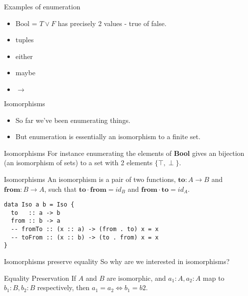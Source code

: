\documentclass[tikz]{beamer}
\theoremstyle{definition}
\begin{document}
\begin{frame}{Examples of enumeration}

    \begin{itemize}
    	\item Bool = $T \lor F$ has precisely 2 values - true of false.
	\item tuples
	\item either
	\item maybe
	\item $\to$
    \end{itemize}

\end{frame}{}

\begin{frame}{Isomorphisms}
	\begin{itemize}
	\item So far we've been enumerating things.
	\item But enumeration is essentially an isomorphism to a finite set.
	\end{itemize}
\end{frame}

\begin{frame}{Isomorphisms}
	For instance enumerating the elements of \textbf{Bool} gives an bijection (an isomorphism of sets) to a set with 2 elements $\{\top, \perp\}$.
\end{frame}

\begin{frame}[fragile]{Isomorphisms}
An isomorphism is a pair of two functions, $\mathbf{to}: A \to B$ and $\mathbf{from}: B \to A$, such that $\mathbf{to} \cdot \mathbf{from} = id_B$ and $\mathbf{from} \cdot \mathbf{to} = id_A$.

\begin{verbatim}
data Iso a b = Iso {
  to   :: a -> b
  from :: b -> a
  -- fromTo :: (x :: a) -> (from . to) x = x
  -- toFrom :: (x :: b) -> (to . from) x = x
}
\end{verbatim}
\end{frame}

\begin{frame}[fragile]{Isomorphisms preserve equality}
So why are we interested in isomorphisms?

\begin{block}{Equality Preservation}
    If $A$ and $B$ are isomorphic, and $a_1: A, a_2: A$ map to $b_1: B, b_2: B$ respectively, then $a_1 = a_2 \iff b_1 = b2$.
\end{block}
\end{frame}
\end{document}

